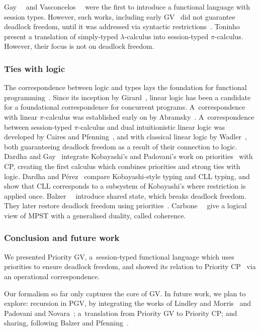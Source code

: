 \documentclass[main.tex]{subfiles}
\begin{document}
Gay~\etal~\cite{gaynagarajan03} and Vasconcelos~\etal~\cite{vasconcelosravara04,vasconcelosgay06} were the first to introduce a functional language with session types. However, such works, including early GV~\cite{gayvasconcelos10,gayvasconcelos12} did not guarantee deadlock freedom, until it was addressed via syntactic restrictions~\cite{lindleymorris15,wadler15}. Toninho~\etal~\cite{toninhocaires12} present a translation of simply-typed $\lambda$-calculus into session-typed $\pi$-calculus. However, their focus is not on deadlock freedom.

\subsubsection*{Ties with logic}
The correspondence between logic and types lays the foundation for functional programming~\cite{wadler15}. Since its inception by Girard~\cite{girard87}, linear logic has been a candidate for a foundational correspondence for concurrent programs. A~correspondence with linear $\pi$-calculus was established early on by Abramsky~\cite{abramsky94,bellinscott94}. A~correspondence between session-typed $\pi$-calculus and dual intuitionistic linear logic was developed by Caires and Pfenning~\cite[$\pi\text{DILL}$]{cairespfenning10}, and with classical linear logic by Wadler~\cite[CP]{wadler15}, both guaranteeing deadlock freedom as a result of their connection to logic. Dardha and Gay~\cite[PCP]{dardhagay18} integrate Kobayashi's and Padovani's work on priorities~\cite{kobayashi06,padovani14} with CP, creating the first calculus which combines priorities and strong ties with logic. Dardha and P\'{e}rez~\cite{dardhaperez15} compare Kobayashi-style typing and CLL typing, and show that CLL corresponds to a subsystem of Kobayashi's where restriction is applied once. Balzer~\etal~\cite[$\text{SILL}_S$]{balzerpfenning17} introduce shared state, which breaks deadlock freedom. They later restore deadlock freedom using priorities~\cite[$\text{SILL}_{S+}$]{balzertoninho19}.
Carbone~\etal~\cite{carbonelindley16} give a logical view of MPST with a generalised duality, called coherence.

\subsubsection*{Conclusion and future work}
We presented Priority GV, a~session-typed functional language which uses priorities to ensure deadlock freedom, and showed its relation to Priority CP~\cite{dardhagay18} via an operational correspondence.

Our formalism so far only captures the core of GV. In future work, we plan to explore: recursion in PGV, by integrating the works of Lindley and Morris~\cite{lindleymorris16} and Padovani and Novara~\cite{padovaninovara15}; a~translation from Priority GV to Priority CP; and sharing, following Balzer and Pfenning~\cite{balzerpfenning17}.
\end{document}
